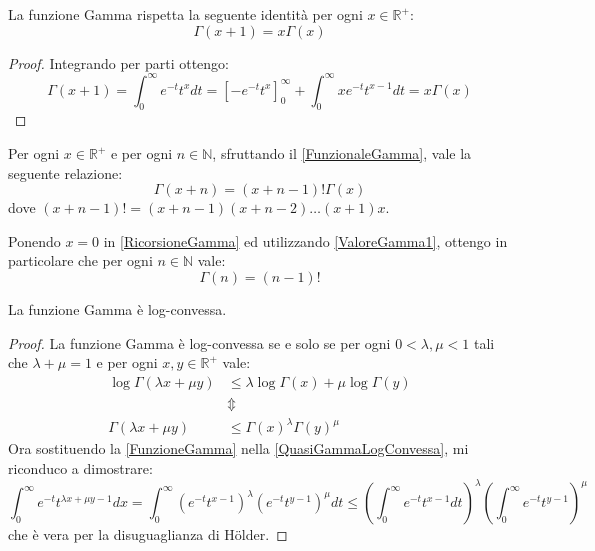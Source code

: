 \begin{lemma}\label{FunzionaleGamma}
	La funzione Gamma rispetta la seguente identità per ogni $x\in\mathbb{R^+}$:
	\begin{equation*}
		\Gamma(x+1)=x\Gamma(x)
	\end{equation*}
\end{lemma}
\begin{proof}
	Integrando per parti ottengo:
	\begin{equation*} 
		\Gamma(x+1)=\int_0^{\infty}{e^{-t}t^xdt}=\left[-e^{-t}t^x\right]_0^{\infty}+\int_0^{\infty}xe^{-t}t^{x-1}dt=x\Gamma(x)
	\end{equation*}
\end{proof}

\begin{remark} \label{RicorsioneGamma}
	Per ogni $x\in\mathbb{R^+}$ e per ogni $n\in\mathbb{N}$, sfruttando il \cref{FunzionaleGamma}, vale la seguente relazione:
	\begin{equation}
		\Gamma(x+n)=(x+n-1)!\Gamma(x)
	\end{equation}
	dove $(x+n-1)!=(x+n-1)(x+n-2)\dots(x+1)x$.
\end{remark}

\begin{remark} \label{ValoreGammaNaturali}
	Ponendo $x=0$ in \cref{RicorsioneGamma} ed utilizzando \cref{ValoreGamma1}, ottengo in particolare che per ogni $n\in\mathbb{N}$ vale:
	\begin{equation}
		\Gamma(n)=(n-1)!
	\end{equation}
\end{remark}


\begin{lemma}\label{GammaLogConvessa}
	La funzione Gamma è log-convessa.
\end{lemma}
\begin{proof}
	La funzione Gamma è log-convessa se e solo se per ogni $0<\lambda,\mu < 1$ tali che $\lambda+\mu=1$
	e per ogni $x,y \in \mathbb{R}^+$ vale:
	\begin{equation}\label{QuasiGammaLogConvessa}
	\begin{split} 
		\log \Gamma(\lambda x+\mu y )  & \le \lambda \log \Gamma(x) + \mu\log \Gamma( y )\\
		& \Updownarrow  \\
		\Gamma(\lambda x+\mu y ) & \le  \Gamma(x)^{\lambda}\Gamma( y )^{\mu}
	\end{split}\end{equation}
	Ora sostituendo la \cref{FunzioneGamma} nella \cref{QuasiGammaLogConvessa}, mi riconduco a dimostrare:
	\begin{equation*}
		\int_0^{\infty}{e^{-t}t^{\lambda x+\mu y-1}dx}=\int_0^{\infty}{(e^{-t}t^{x-1})^\lambda (e^{-t}t^{y-1})^{\mu}dt} \le 
		\left(\int_0^{\infty}{e^{-t}t^{x-1}dt}\right)^\lambda \left(\int_0^{\infty}{e^{-t}t^{y-1}}\right)^{\mu}
	\end{equation*}
	che è vera per la disuguaglianza di Hölder.
\end{proof}
 
